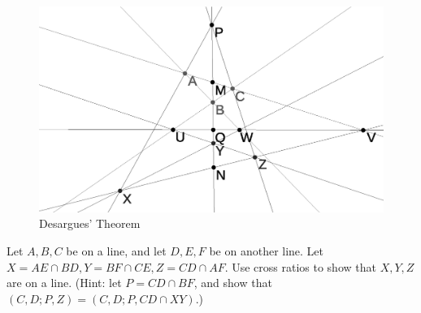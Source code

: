 \begin{figure}[!htb]
\centering
\includegraphics[scale=0.7]{desargues.eps}
\caption{Desargues' Theorem}
\end{figure}

\begin{exer} Let $A,B,C$ be on a line, and let $D,E,F$ be on another line. Let $X = AE\cap BD, Y = BF\cap CE, Z = CD\cap AF$. Use cross ratios to show that $X,Y,Z$ are on a line. (Hint: let $P = CD\cap BF$, and show that $(C,D;P,Z) = (C,D;P,CD\cap XY)$.)
\end{exer}

